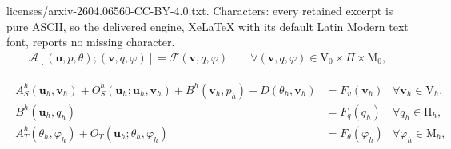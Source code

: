 \documentclass[10pt,a4paper]{amsart}
\begin{document}
licenses/arxiv-2604.06560-CC-BY-4.0.txt. Characters: every retained excerpt is pure ASCII, so the delivered engine, XeLaTeX with its default Latin Modern text font, reports no missing character.
\begin{align}\label{bb}
	\mathcal{A}\left[\left(\boldsymbol{u}, p, \theta \right) ;\left(\boldsymbol {v}, q, \varphi \right)\right]=\mathcal{F}(\boldsymbol{v}, q, \varphi )  \qquad \forall  \left(\boldsymbol{v}, q, \varphi  \right) \in \mathrm{V}_{0} \times \Pi \times \mathrm{M}_{0},
	\end{align}

  	    \begin{equation}\label{E}
  	    \begin{aligned}
  	    \begin{array}{rlrl}
  	    {A}_S^h(\boldsymbol{u}_h, \boldsymbol{v}_h) + {O}_S^h(\boldsymbol{u}_h ; \boldsymbol{u}_h, \boldsymbol{v}_h) + {B}^h(\boldsymbol{v}_h,p_h) - D(\theta_h,\boldsymbol{v}_h)& = F_{v}(\boldsymbol{v}_h) & \forall \boldsymbol{v}_h \in \mathrm{V}_h, \\
  	    {B}^h(\boldsymbol{u}_h, q_h) & = F_q(q_h) & \forall q_h \in \mathrm{\Pi}_h, \\ 
       {A}^h_T(\theta_h,\varphi_h) + O_T(\boldsymbol{u}_h; \theta_h, \varphi_h) & = F_{\theta}(\varphi_h) & \forall \varphi_h \in \mathrm{M}_{h},
  	    \end{array}
  	    \end{aligned}
  	    \end{equation} 
\end{document}
